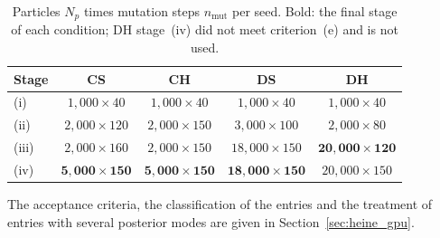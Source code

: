 \begin{table}[htbp]
  \centering\small
  \begin{tabular}{@{}lcccc@{}}
    \toprule
    Stage & CS & CH & DS & DH\\
    \midrule
    (i)   & $1{,}000\times40$  & $1{,}000\times40$  & $1{,}000\times40$   & $1{,}000\times40$\\
    (ii)  & $2{,}000\times120$ & $2{,}000\times150$ & $3{,}000\times100$  & $2{,}000\times80$\\
    (iii) & $2{,}000\times160$ & $2{,}000\times150$ & $18{,}000\times150$ & $\mathbf{20{,}000\times120}$\\
    (iv)  & $\mathbf{5{,}000\times150}$ & $\mathbf{5{,}000\times150}$ & $\mathbf{18{,}000\times150}$ & $20{,}000\times150$\\
    \bottomrule
  \end{tabular}
  \caption[Particles and mutation steps per stage]{Particles $N_p$ times
  mutation steps $n_{\mathrm{mut}}$ per seed. Bold: the final stage of each
  condition; DH stage~(iv) did not meet criterion~(e) and is not used.}
  \label{tab:app_np}
\end{table}
The acceptance criteria, the classification of the entries and the
treatment of entries with several posterior modes are given in
Section~\ref{sec:heine_gpu}.
